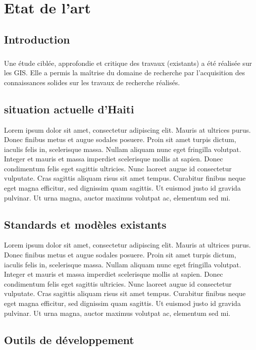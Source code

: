\chapter{Etat de l'art}
\section{Introduction}
\paragraph{}
Une étude ciblée, approfondie et critique des travaux (existants) a été réalisée sur 
les GIS. Elle a permis la maîtrise du domaine de recherche par l’acquisition des 
connaissances solides sur les travaux de recherche réalisés.

\section{situation actuelle d'Haiti}
Lorem ipsum dolor sit amet, consectetur adipiscing elit. Mauris at ultrices purus. Donec finibus metus et augue sodales posuere. Proin sit amet turpis dictum, iaculis felis in, scelerisque massa. Nullam aliquam nunc eget fringilla volutpat. Integer et mauris et massa imperdiet scelerisque mollis at sapien. Donec condimentum felis eget sagittis ultricies. Nunc laoreet augue id consectetur vulputate. Cras sagittis aliquam risus sit amet tempus. Curabitur finibus neque eget magna efficitur, sed dignissim quam sagittis. Ut euismod justo id gravida pulvinar. Ut urna magna, auctor maximus volutpat ac, elementum sed mi.


\section{Standards et modèles existants}
Lorem ipsum dolor sit amet, consectetur adipiscing elit. Mauris at ultrices purus. Donec finibus metus et augue sodales posuere. Proin sit amet turpis dictum, iaculis felis in, scelerisque massa. Nullam aliquam nunc eget fringilla volutpat. Integer et mauris et massa imperdiet scelerisque mollis at sapien. Donec condimentum felis eget sagittis ultricies. Nunc laoreet augue id consectetur vulputate. Cras sagittis aliquam risus sit amet tempus. Curabitur finibus neque eget magna efficitur, sed dignissim quam sagittis. Ut euismod justo id gravida pulvinar. Ut urna magna, auctor maximus volutpat ac, elementum sed mi.


\section{Outils de développement }
